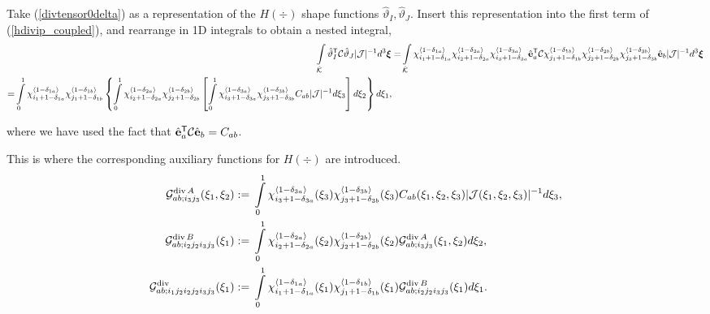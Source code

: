 Take (\ref{divtensor0delta}) as a representation of the $H(\div)$ shape functions $\hat{\vartheta}_I,\hat{\vartheta}_J$. Insert this representation into the first term of (\ref{hdivip_coupled}), and rearrange in 1D integrals to obtain a nested integral,
% 
\begin{align}
    \int\limits_{\hat{\mathcal{K}}}\hat{\vartheta}_I^{\mathsf{T}}\mathcal{C}\hat{\vartheta}_J|\mathcal{J}|^{-1}d^3\boldsymbol{\xi}
    =& \int\limits_{\hat{\mathcal{K}}}
    \chi_{i_1+1-\delta_{1a}}^{\langle1-\delta_{1a}\rangle}\chi_{i_2+1-\delta_{2a}}^{\langle1-\delta_{2a}\rangle}\chi_{i_3+1-\delta_{3a}}^{\langle1-\delta_{3a}\rangle}\hat{\mathbf{e}}_a^{\mathsf{T}} \mathcal{C} \chi_{j_1+1-\delta_{1b}}^{\langle1-\delta_{1b}\rangle}\chi_{j_2+1-\delta_{2b}}^{\langle1-\delta_{2b}\rangle}\chi_{j_3+1-\delta_{3b}}^{\langle1-\delta_{3b}\rangle}\hat{\mathbf{e}}_b |\mathcal{J}|^{-1}d^3\boldsymbol{\xi}\nonumber\\
    \begin{split}
    =& \int\limits_0^1 \chi_{i_1+1-\delta_{1a}}^{\langle1-\delta_{1a}\rangle}\chi_{j_1+1-\delta_{1b}}^{\langle1-\delta_{1b}\rangle}\left\{\int\limits_0^1 \chi_{i_2+1-\delta_{2a}}^{\langle1-\delta_{2a}\rangle}\chi_{j_2+1-\delta_{2b}}^{\langle1-\delta_{2b}\rangle} \left[ \int\limits_0^1
    \chi_{i_3+1-\delta_{3a}}^{\langle1-\delta_{3a}\rangle}\chi_{j_3+1-\delta_{3b}}^{\langle1-\delta_{3b}\rangle}C_{ab} |\mathcal{J}|^{-1} d\xi_3\right]d\xi_2\right\}d\xi_1,
    \end{split}
        \label{hdivterm1}
\end{align}

\noindent where we have used the fact that $\hat{\mathbf{e}}_a^{\mathsf{T}}\mathcal{C}\hat{\mathbf{e}}_b=C_{ab}$.

This is where the corresponding auxiliary functions for $H(\div)$ are introduced. 
% 
\begin{align}
    \mathcal{G}^{\operatorname{div} A}_{ab;i_3j_3}(\xi_1,\xi_2):={}&\int\limits_0^1 \chi_{i_3+1-\delta_{3a}}^{\langle1-\delta_{3a}\rangle}(\xi_3)\chi_{j_3+1-\delta_{3b}}^{\langle1-\delta_{3b}\rangle}(\xi_3) C_{ab}(\xi_1,\xi_2,\xi_3) |\mathcal{J}(\xi_1,\xi_2,\xi_3)|^{-1} d\xi_3,\label{GA_hdiv}\\
    \mathcal{G}^{\operatorname{div} B}_{ab;i_2j_2i_3j_3}(\xi_1):={}&\int\limits_0^1 \chi_{i_2+1-\delta_{2a}}^{\langle1-\delta_{2a}\rangle}(\xi_2)\chi_{j_2+1-\delta_{2b}}^{\langle1-\delta_{2b}\rangle}(\xi_2)
    \mathcal{G}^{\operatorname{div} A}_{ab;i_3j_3}(\xi_1,\xi_2) d\xi_2,\label{GB_hdiv}\\
    \mathcal{G}^{\operatorname{div}}_{ab;i_1j_2i_2j_2i_3j_3}(\xi_1):={}&\int\limits_0^1
    \chi_{i_1+1-\delta_{1a}}^{\langle1-\delta_{1a}\rangle}(\xi_1)\chi_{j_1+1-\delta_{1b}}^{\langle1-\delta_{1b}\rangle}(\xi_1)
    \mathcal{G}^{\operatorname{div} B}_{ab;i_2j_2i_3j_3}(\xi_1) d\xi_1.\label{ip_hdiv_GAB}
\end{align}


